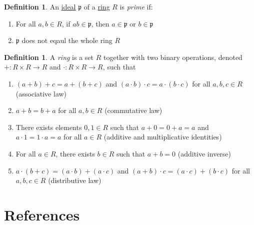 \documentclass[10pt,a4paper]{article}
\theoremstyle{plain}
\theoremstyle{definition}
\newtheorem{definition}[subsection]{Definition}
\theoremstyle{remark}
\begin{document}
  \begin{definition} \label{primeideal}%
    An \hyperref[ideal]{ideal} $\mathfrak{p}$ of a \hyperref[ring]{ring} $R$ is \emph{prime} if:
    \begin{enumerate}
      \item For all $a,b \in R$, if $ab \in \mathfrak{p}$, then $a \in \mathfrak{p}$ or $b \in \mathfrak{p}$
      \item $\mathfrak{p}$ does not eqaul the whole ring $R$
    \end{enumerate}
  \end{definition}

  \begin{definition} \label{ring} %
    A \emph{ring} is a set $R$ together with two binary operations, denoted $+: R \times R \longrightarrow R$ and $\cdot: R \times R \longrightarrow R$, such that
    \begin{enumerate}
      \item $(a+b)+c = a+(b+c)$ and $(a \cdot b) \cdot c = a \cdot (b \cdot c)$ for all $a,b,c \in R$ (associative law)
      \item $a+b = b+a$ for all $a,b \in R$ (commutative law)
      \item There exists elements $0,1 \in R$ such that $a+0 = 0 + a = a $ and $a\cdot1 = 1 \cdot a = a $ for all $a \in R$ (additive and multiplicative identities)
      \item For all $a \in R$, there exists $b \in R$ such that $a+b = 0$ (additive inverse)
      \item $a\cdot(b+c) = (a \cdot b) + (a \cdot c)$ and $(a+b) \cdot c = (a \cdot c) + (b \cdot c)$ for all $a,b,c \in R$ (distributive law)
    \end{enumerate}
  \end{definition}

\section{References}
\end{document}
